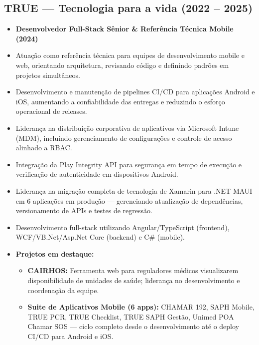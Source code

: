 \documentclass[a4paper,10pt]{article}
\begin{document}
\subsection*{TRUE --- Tecnologia para a vida (2022 -- 2025)}
\begin{itemize}[leftmargin=1cm]
    \item \textbf{Desenvolvedor Full-Stack Sênior \& Referência Técnica Mobile (2024)}
    \item Atuação como referência técnica para equipes de desenvolvimento mobile e web, orientando arquitetura, revisando código e definindo padrões em projetos simultâneos.
    \item Desenvolvimento e manutenção de pipelines CI/CD para aplicações Android e iOS, aumentando a confiabilidade das entregas e reduzindo o esforço operacional de releases.
    \item Liderança na distribuição corporativa de aplicativos via Microsoft Intune (MDM), incluindo gerenciamento de configurações e controle de acesso alinhado a RBAC.
    \item Integração da Play Integrity API para segurança em tempo de execução e verificação de autenticidade em dispositivos Android.
    \item Liderança na migração completa de tecnologia de Xamarin para .NET MAUI em 6 aplicações em produção --- gerenciando atualização de dependências, versionamento de APIs e testes de regressão.
    \item Desenvolvimento full-stack utilizando Angular/TypeScript (frontend), WCF/VB.Net/Asp.Net Core (backend) e C\# (mobile).
    \item \textbf{Projetos em destaque:}
    \begin{itemize}
        \item \textbf{CAIRHOS:} Ferramenta web para reguladores médicos visualizarem disponibilidade de unidades de saúde; liderança no desenvolvimento e coordenação da equipe.
        \item \textbf{Suite de Aplicativos Mobile (6 apps):} CHAMAR 192, SAPH Mobile, TRUE PCR, TRUE Checklist, TRUE SAPH Gestão, Unimed POA Chamar SOS --- ciclo completo desde o desenvolvimento até o deploy CI/CD para Android e iOS.
    \end{itemize}
\end{itemize}
\end{document}
